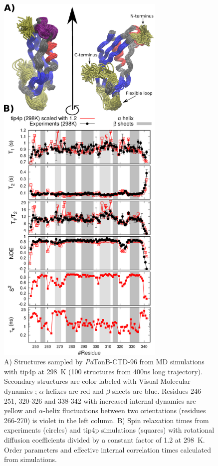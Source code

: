 \documentclass[journal=jpcbfk,manuscript=article]{achemso}
\begin{document}
\begin{figure}[p]
  \includegraphics[width=8.0cm]{../Figs/RELdataPsTonB2.eps}%
  \caption{A) Structures sampled by {\it Pa}TonB-CTD-96 from MD simulations with tip4p at 298~K
    (100 structures from 400ns long trajectory). Secondary structures
    are color labeled with Visual Molecular dynamics \cite{frishman95,humphrey96};
    $\alpha$-helixes are red and $\beta$-sheets are blue.
    Residues 246-251, 320-326 and 338-342 with increased internal dynamics are yellow and
    $\alpha$-helix fluctuations between two orientations (residues 266-270) is violet in the left column.
    B) Spin relaxation times from experiments (circles) and tip4p
    simulations (squares) with rotational diffusion coefficients divided by a
    constant factor of 1.2 at 298~K. Order parameters and effective internal correlation
    times calculated from simulations. \label{PsTonBrelaxationDATAscaled}}%
\end{figure}
\end{document}
